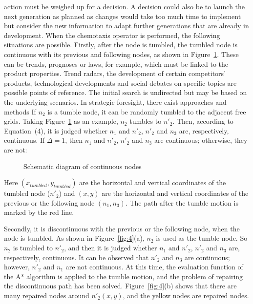 \documentclass{PDS}%
\theoremstyle{definition}
\begin{document}
action must be weighed up for a decision. A decision could also be to launch the next generation as
planned as changes would take too much time to implement but consider the new information to adapt
further generations that are already in development.
When the chemotaxis operator is performed, the following situations are possible.
Firstly, after the node is tumbled, the tumbled node is continuous with its previous and
following nodes, as shown in Figure~\ref{fig:3}. These can be trends, prognoses or laws, for example, which
must be linked to the product properties. Trend radars, the development of certain competitors' products,
technological developments and social debates on specific topics are possible points of reference. The
initial search is undirected but may be based on the underlying scenarios. In strategic foresight, there
exist approaches and methods If $n_2$ is a tumble node, it can be
randomly tumbled to the adjacent free grids. Taking Figure~\ref{fig:3} as an
\hbox{example,} $n_2$ tumbles to $n'_2$. Then, according to Equation~(4), it is judged
whether $n_1$ and $n'_2$, $n'_2$ and $n_3$ are, respectively, continuous. If $\Delta=1$, then
$n_1$ and $n'_2$, $n'_2$ and $n_3$ are continuous; otherwise, they are not:
\begin{figure}[h!]
\caption{Schematic diagram of continuous nodes}
\label{fig:3}
\end{figure}

Here
$(x_{tumbled}, y_{tumbled})$ are the horizontal and vertical coordinates of the tumbled
node ($n'_2$) and $(x, y)$ are the horizontal and vertical coordinates of the previous or
the following node $(n_1, n_3)$. The path after the tumble motion is marked by the red
line.

Secondly, it is discontinuous with the previous or the following node, when the node is
tumbled. As shown in Figure~\ref{fig:4}(a), $n_2$ is used as the tumble node. So $n_2$ is
tumbled to $n'_2$, and then it is judged whether $n_1$ and $n'_2$, $n'_2$ and $n_3$ are,
respectively, continuous. It can be observed that $n'_2$ and $n_3$ are continuous;
however, $n'_2$ and $n_1$ are not continuous. At this time, the evaluation function of
the A* algorithm is applied to the tumble motion, and the problem of repairing the
discontinuous path has been solved. Figure~\ref{fig:4}(b) shows that there are many
repaired nodes around $n'_2(x, y)$, and the yellow nodes are repaired nodes.
\end{document}
